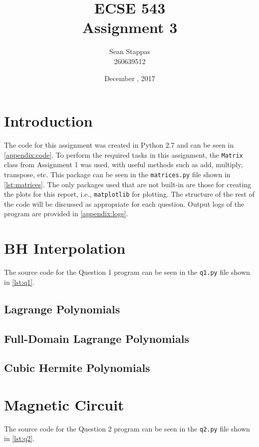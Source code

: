 \documentclass[a4paper,titlepage]{article}
\title{\textbf{ECSE 543 \\ Assignment 3}}
\author{Sean Stappas \\ 260639512}
\date{December \nth{7}, 2017}
\begin{document}
	\sloppy
	\maketitle
	
	\tableofcontents
	
	
	\twocolumn
	
	\section*{Introduction}
	The code for this assignment was created in Python 2.7 and can be seen in \autoref{appendix:code}. To perform the required tasks in this assignment, the \texttt{Matrix} class from Assignment 1 was used, with useful methods such as add, multiply, transpose, etc. This package can be seen in the \texttt{matrices.py} file shown in \autoref{lst:matrices}. The only packages used that are not built-in are those for creating the plots for this report, i.e., \texttt{matplotlib} for plotting. The structure of the rest of the code will be discussed as appropriate for each question. Output logs of the program are provided in \autoref{appendix:logs}.
	
	
	\section{BH Interpolation}
	The source code for the Question 1 program can be seen in the \texttt{q1.py} file shown in \cref{lst:q1}.
	
	\subsection{Lagrange Polynomials}
	
	
	\subsection{Full-Domain Lagrange Polynomials}
	
	\subsection{Cubic Hermite Polynomials}
	
	
	\section{Magnetic Circuit}
	The source code for the Question 2 program can be seen in the \texttt{q2.py} file shown in \cref{lst:q2}.
	
\end{document}
